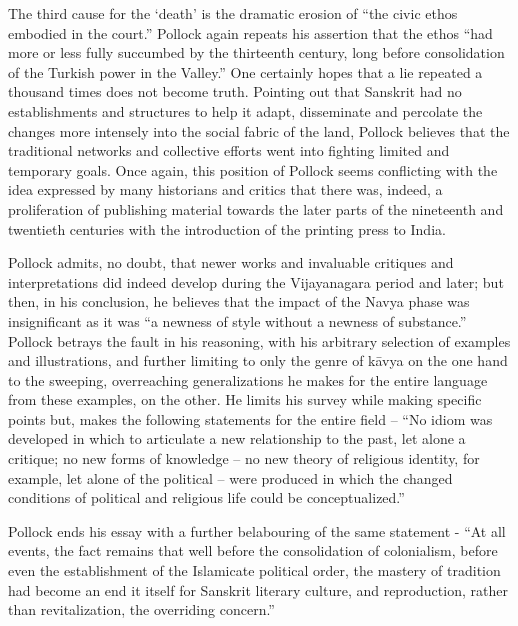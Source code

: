 The third cause for the ‘death’ is the dramatic erosion of “the civic ethos embodied in the court.” Pollock again repeats his assertion that the ethos “had more or less fully succumbed by the thirteenth century, long before consolidation of the Turkish power in the Valley.” One certainly hopes that a lie repeated a thousand times does not become truth. Pointing out that Sanskrit had no establishments and structures to help it adapt, disseminate and percolate the changes more intensely into the social fabric of the land, Pollock believes that the traditional networks and collective efforts went into fighting limited and temporary goals. Once again, this position of Pollock seems conflicting with the idea expressed by many historians and critics that there was, indeed, a proliferation of publishing material towards the later parts of the nineteenth and twentieth centuries with the introduction of the printing press to India.
\newpage

Pollock admits, no doubt, that newer works and invaluable critiques and interpretations did indeed develop during the Vijayanagara period and later; but then, in his conclusion, he believes that the impact of the Navya phase was insignificant as it was “a newness of style without a newness of substance.” Pollock betrays the fault in his reasoning, with his arbitrary selection of examples and illustrations, and further limiting to only the genre of kāvya on the one hand to the sweeping, overreaching generalizations he makes for the entire language from these examples, on the other. He limits his survey while making specific points but, makes the following statements for the entire field – “No idiom was developed in which to articulate a new relationship to the past, let alone a critique; no new forms of knowledge – no new theory of religious identity, for example, let alone of the political – were produced in which the changed conditions of political and religious life could be conceptualized.”

Pollock ends his essay with a further belabouring of the same statement - “At all events, the fact remains that well before the consolidation of colonialism, before even the establishment of the Islamicate political order, the mastery of tradition had become an end it itself for Sanskrit literary culture, and reproduction, rather than revitalization, the overriding concern.”   

